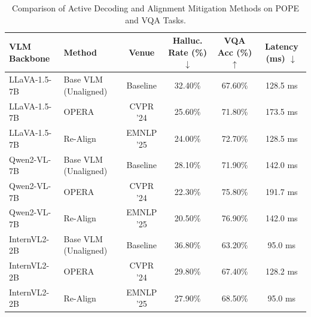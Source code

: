 \begin{table}[t]
\centering
\small
\caption{Comparison of Active Decoding and Alignment Mitigation Methods on POPE and VQA Tasks.}
\label{tab:mitigation_comparison}
\begin{tabular}{llcccc}
\toprule
\textbf{VLM Backbone} & \textbf{Method} & \textbf{Venue} & \textbf{Halluc. Rate} (\%) $\downarrow$ & \textbf{VQA Acc} (\%) $\uparrow$ & \textbf{Latency} (ms) $\downarrow$ \\
\midrule
LLaVA-1.5-7B & Base VLM (Unaligned) & Baseline & 32.40\% & 67.60\% & 128.5 ms \\
LLaVA-1.5-7B & OPERA & CVPR '24 & 25.60\% & 71.80\% & 173.5 ms \\
LLaVA-1.5-7B & Re-Align & EMNLP '25 & 24.00\% & 72.70\% & 128.5 ms \\
Qwen2-VL-7B & Base VLM (Unaligned) & Baseline & 28.10\% & 71.90\% & 142.0 ms \\
Qwen2-VL-7B & OPERA & CVPR '24 & 22.30\% & 75.80\% & 191.7 ms \\
Qwen2-VL-7B & Re-Align & EMNLP '25 & 20.50\% & 76.90\% & 142.0 ms \\
InternVL2-2B & Base VLM (Unaligned) & Baseline & 36.80\% & 63.20\% & 95.0 ms \\
InternVL2-2B & OPERA & CVPR '24 & 29.80\% & 67.40\% & 128.2 ms \\
InternVL2-2B & Re-Align & EMNLP '25 & 27.90\% & 68.50\% & 95.0 ms \\
\bottomrule
\end{tabular}
\end{table}